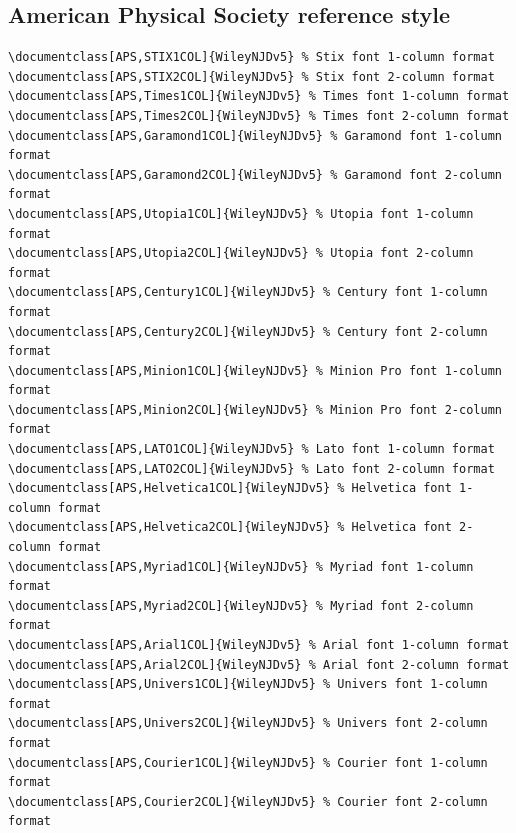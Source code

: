 \documentclass[11pt]{article}
\begin{document}
\subsection*{American Physical Society reference style}
{\fontsize{9}{10}\selectfont\begin{verbatim}
\documentclass[APS,STIX1COL]{WileyNJDv5} % Stix font 1-column format
\documentclass[APS,STIX2COL]{WileyNJDv5} % Stix font 2-column format
\documentclass[APS,Times1COL]{WileyNJDv5} % Times font 1-column format
\documentclass[APS,Times2COL]{WileyNJDv5} % Times font 2-column format
\documentclass[APS,Garamond1COL]{WileyNJDv5} % Garamond font 1-column format
\documentclass[APS,Garamond2COL]{WileyNJDv5} % Garamond font 2-column format
\documentclass[APS,Utopia1COL]{WileyNJDv5} % Utopia font 1-column format
\documentclass[APS,Utopia2COL]{WileyNJDv5} % Utopia font 2-column format
\documentclass[APS,Century1COL]{WileyNJDv5} % Century font 1-column format
\documentclass[APS,Century2COL]{WileyNJDv5} % Century font 2-column format
\documentclass[APS,Minion1COL]{WileyNJDv5} % Minion Pro font 1-column format
\documentclass[APS,Minion2COL]{WileyNJDv5} % Minion Pro font 2-column format
\documentclass[APS,LATO1COL]{WileyNJDv5} % Lato font 1-column format
\documentclass[APS,LATO2COL]{WileyNJDv5} % Lato font 2-column format
\documentclass[APS,Helvetica1COL]{WileyNJDv5} % Helvetica font 1-column format
\documentclass[APS,Helvetica2COL]{WileyNJDv5} % Helvetica font 2-column format
\documentclass[APS,Myriad1COL]{WileyNJDv5} % Myriad font 1-column format
\documentclass[APS,Myriad2COL]{WileyNJDv5} % Myriad font 2-column format
\documentclass[APS,Arial1COL]{WileyNJDv5} % Arial font 1-column format
\documentclass[APS,Arial2COL]{WileyNJDv5} % Arial font 2-column format
\documentclass[APS,Univers1COL]{WileyNJDv5} % Univers font 1-column format
\documentclass[APS,Univers2COL]{WileyNJDv5} % Univers font 2-column format
\documentclass[APS,Courier1COL]{WileyNJDv5} % Courier font 1-column format
\documentclass[APS,Courier2COL]{WileyNJDv5} % Courier font 2-column format
\end{verbatim}}

\pagebreak
\end{document}
